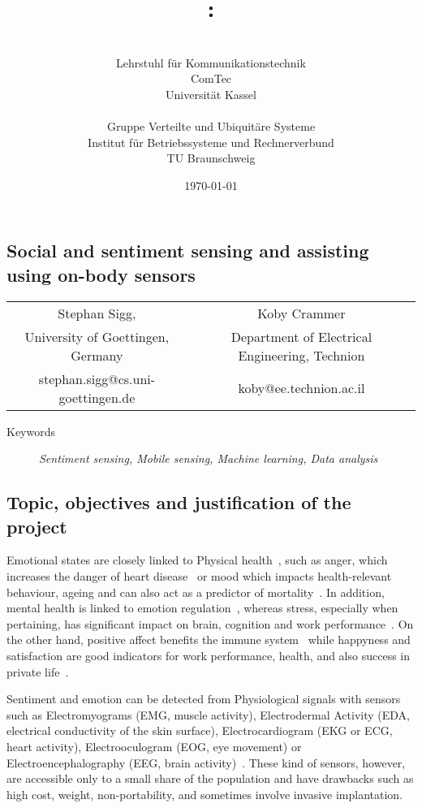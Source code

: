 \documentclass[12pt]{article}
\author{\begin{minipage}[t]{7.1cm}\centering \small \VornameAntragstellerA\ \NachnameAntragstellerA\\ \small Lehrstuhl für Kommunikationstechnik\\ \small ComTec\\ \small Universität Kassel\end{minipage}
\begin{minipage}[t]{7.1cm}\centering \small \VornameAntragstellerB\ \NachnameAntragstellerB\\ \small Gruppe Verteilte und Ubiquitäre Systeme \\ \small Institut für Betriebssysteme und Rechnerverbund\\ \small TU Braunschweig\end{minipage}}
\title{\projektname:\\\notiz{Social and sentiment sensing and assisting using on-body sensors}}
\date{\small \today}
\begin{document}
\onehalfspacing %
\setcounter{secnumdepth}{5}
\pagebreak
\begin{center}
\section*{Social and sentiment sensing and assisting using on-body sensors}
\begin{tabular}{cc}
  Stephan Sigg, & Koby Crammer\\
  University of Goettingen, Germany & Department of Electrical Engineering, Technion \\
 stephan.sigg@cs.uni-goettingen.de & koby@ee.technion.ac.il
\end{tabular}

\end{center}
\begin{description}
	\item[Keywords] \textit{Sentiment sensing, Mobile sensing, Machine learning, Data analysis}
\end{description}

\subsection*{Topic, objectives and justification of the project}
Emotional states are closely linked to Physical health~\cite{SentimentSensing_Salovey_2000}, such as anger, which increases the danger of heart disease~\cite{SentimentSensing_Smith_2004} or mood which impacts health-relevant behaviour, ageing and can also act as a predictor of mortality~\cite{SentimentSensing_Todaro_2003}.
In addition, mental health is linked to emotion regulation~\cite{SentimentSensing_Gross_1995}, whereas stress, especially when pertaining, has significant impact on brain, cognition and work performance~\cite{SentimentSensing_Lupien_2009}.
On the other hand, positive affect benefits the immune system~\cite{SentimentSensing_Smith_2004} while happyness and satisfaction are good indicators for work performance, health, and also success in private life~\cite{SentimentSensing_Lyubomirsky_2005}.

Sentiment and emotion can be detected from Physiological signals with sensors such as Electromyograms (EMG, muscle activity), Electrodermal Activity (EDA, electrical conductivity of the skin surface), Electrocardiogram (EKG or ECG, heart activity), Electrooculogram (EOG, eye movement) or Electroencephalography (EEG, brain activity)~\cite{SentimentSensing_Calvo_2010}.
These kind of sensors, however, are accessible only to a small share of the population and have drawbacks such as high cost, weight, non-portability, and sometimes involve invasive implantation.
\end{document}
